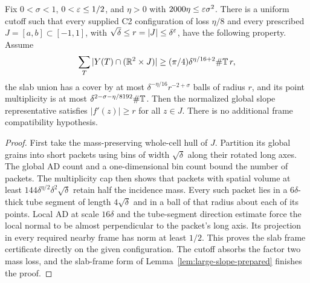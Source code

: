 \begin{lemma}
\label{lem:large-slope-normalized-interval}
\leanok
{}
Fix $0<\sigma<1$, $0<\varepsilon\leq1/2$, and $\eta>0$ with
$2000\eta\leq\varepsilon\sigma^2$. There is a uniform cutoff such that
every supplied C2 configuration of loss $\eta/8$ and every prescribed
$J=[a,b]\subset[-1,1]$, with $\sqrt\delta\leq r=|J|\leq\delta^\varepsilon$,
have the following property. Assume
\[
 \sum_T |Y(T)\cap(\mathbb{R}^2\times J)|
     \geq(\pi/4)\delta^{\eta/16+2}\#\mathbb{T}\,r,
\]
the slab union has a cover by at most
$\delta^{-\eta/16}r^{-2+\sigma}$ balls of radius $r$, and its point
multiplicity is at most $\delta^{2-\sigma-\eta/8192}\#\mathbb{T}$.
Then the normalized global slope representative satisfies
$|f'(z)|\geq r$ for all $z\in J$.
There is no additional frame compatibility hypothesis.
\end{lemma}
\begin{proof}
\leanok
First take the mass-preserving whole-cell hull of $J$. Partition its
global grains into short packets using bins of width $\sqrt\delta$
along their rotated long axes. The global AD count and a one-dimensional
bin count bound the number of packets. The multiplicity cap then shows
that packets with spatial volume at least
$144\delta^{\eta/2}\delta^2\sqrt\delta$ retain half the incidence mass.
Every such packet lies in a $6\delta$-thick tube segment of length
$4\sqrt\delta$ and in a ball of that radius about each of its points.
Local AD at scale $16\delta$ and the tube-segment direction estimate
force the local normal to be almost perpendicular to the packet's long
axis. Its projection in every required nearby frame has norm at least
$1/2$. This proves the slab frame certificate directly on the given
configuration. The cutoff absorbs the factor two mass loss, and the
slab-frame form of Lemma~\ref{lem:large-slope-prepared} finishes the proof.
\end{proof}

